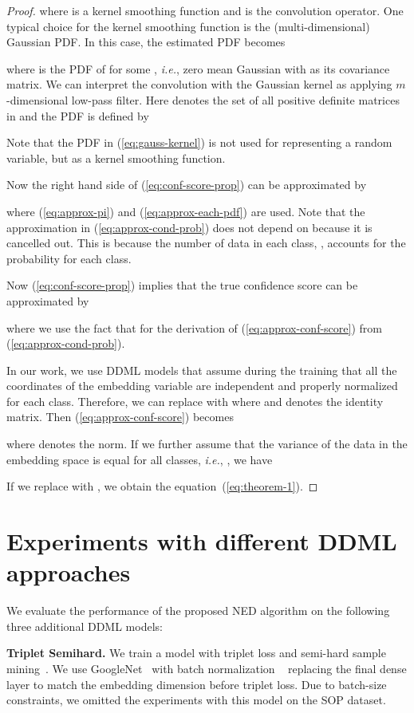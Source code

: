 \documentclass{article}
\newcommand{\embdim}{\ensuremath{m}}
\newcommand{\ie}{{\it i.e.}}
\begin{document}
\begin{proof}
where  is a kernel smoothing function and  is the convolution operator.
One typical choice for the kernel smoothing function is the (multi-dimensional) Gaussian PDF.
In this case, the estimated PDF becomes

where 
is the PDF of  for some , \ie, zero mean Gaussian with  as its covariance matrix.
We can interpret the convolution with the Gaussian kernel
as applying \embdim-dimensional low-pass filter.
Here  denotes the set of all positive definite matrices in 
and the PDF is defined by

Note that the PDF in (\ref{eq:gauss-kernel}) is not used for representing a random variable,
but as a kernel smoothing function.

Now the right hand side of (\ref{eq:conf-score-prop}) can be approximated by

where (\ref{eq:approx-pi}) and (\ref{eq:approx-each-pdf}) are used.
Note that the approximation in (\ref{eq:approx-cond-prob}) does not depend on  because it is cancelled out.
This is because the number of data in each class, , accounts for the probability for each class.

Now (\ref{eq:conf-score-prop}) implies that the true confidence score can be approximated by

where we use the fact that 
for the derivation of (\ref{eq:approx-conf-score}) from (\ref{eq:approx-cond-prob}).



In our work, we use DDML models that assume during the training that all the coordinates of the embedding variable  are independent and properly normalized for each class. Therefore, we can replace   with  where  and  denotes the identity matrix.
Then (\ref{eq:approx-conf-score}) becomes

where  denotes the  norm.
If we further assume that the variance of the data in the embedding space is equal for all classes,
\ie, ,
we have


If we replace   with , we obtain the equation~(\ref{eq:theorem-1}).
\end{proof}

\section{Experiments with different DDML approaches}
\label{sec:results-ddmls}
We evaluate the performance of the proposed NED algorithm on the following three additional DDML
models:

\textbf{Triplet Semihard.} We train a model with triplet loss and semi-hard sample
mining~\cite{b16}. We use GoogleNet~\cite{b60} with batch normalization
~\cite{b61} replacing the final dense layer to match the
embedding dimension before triplet loss. Due to batch-size
constraints, we omitted the experiments with this model on
the SOP dataset.
\end{document}

